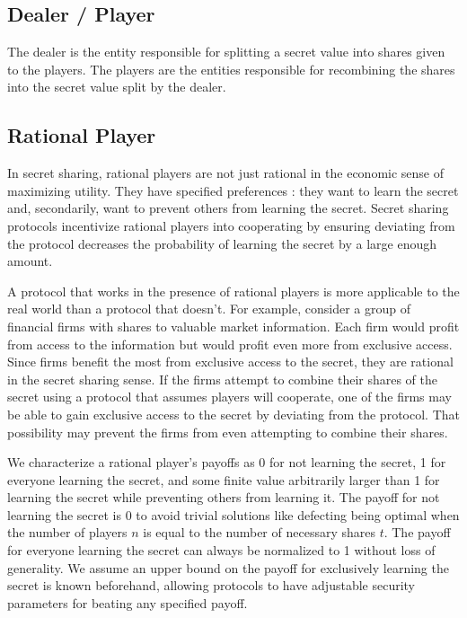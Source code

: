 \documentclass{dalcsthesis}
\begin{document}
\subsection{Dealer / Player}

The dealer is the entity responsible for splitting a secret value into shares given to the players. The players are the entities responsible for recombining the shares into the secret value split by the dealer.

\subsection{Rational Player}

In secret sharing, rational players are not just rational in the economic sense of maximizing utility. They have specified preferences \cite{halpern04}: they want to learn the secret and, secondarily, want to prevent others from learning the secret. Secret sharing protocols incentivize rational players into cooperating by ensuring deviating from the protocol decreases the probability of learning the secret by a large enough amount.

A protocol that works in the presence of rational players is more applicable to the real world than a protocol that doesn't. For example, consider a group of financial firms with shares to valuable market information. Each firm would profit from access to the information but would profit even more from exclusive access. Since firms benefit the most from exclusive access to the secret, they are rational in the secret sharing sense. If the firms attempt to combine their shares of the secret using a protocol that assumes players will cooperate, one of the firms may be able to gain exclusive access to the secret by deviating from the protocol. That possibility may prevent the firms from even attempting to combine their shares.

We characterize a rational player's payoffs as 0 for not learning the secret, 1 for everyone learning the secret, and some finite value arbitrarily larger than 1 for learning the secret while preventing others from learning it. The payoff for not learning the secret is 0 to avoid trivial solutions like defecting being optimal when the number of players $n$ is equal to the number of necessary shares $t$. The payoff for everyone learning the secret can always be normalized to 1 without loss of generality. We assume an upper bound on the payoff for exclusively learning the secret is known beforehand, allowing protocols to have adjustable security parameters for beating any specified payoff.
\end{document}
